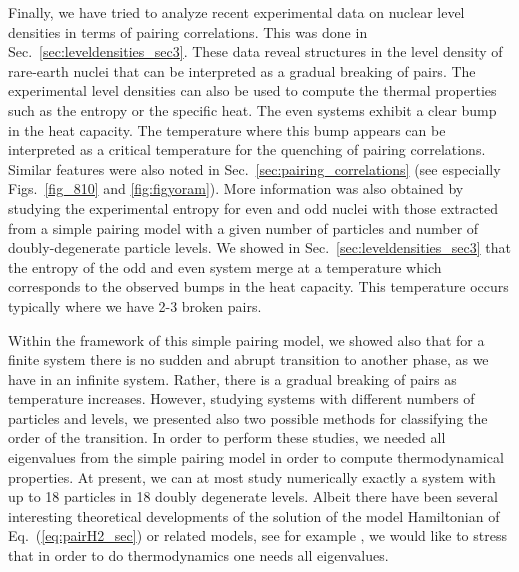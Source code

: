 \documentclass[preprint,rmp,aps,floatfix]{revtex4}
\begin{document}
Finally, we have tried to analyze recent experimental data on nuclear level
densities in terms of pairing correlations. This was done in 
Sec.~\ref{sec:leveldensities_sec3}. These data reveal structures in the level
density of rare-earth nuclei that can be interpreted as a gradual breaking
of pairs. The experimental level densities can also be used to compute the 
thermal properties such as the entropy or the specific heat.
The even systems exhibit a clear bump in the heat capacity. The temperature
where this bump appears can be interpreted as a critical temperature 
for the quenching of pairing correlations. Similar features were also noted in
Sec.~\ref{sec:pairing_correlations} (see especially Figs.~\ref{fig_810} and 
\ref{fig:figyoram}).
More information was also obtained by studying the 
experimental entropy for even and odd nuclei with those
extracted from a simple pairing model with a given number of particles 
and number of doubly-degenerate particle levels. We showed in 
Sec.~\ref{sec:leveldensities_sec3} that the entropy of the odd and even system
merge at a temperature which corresponds to the observed bumps in the 
heat capacity. This temperature occurs typically where we have 2-3 
broken pairs.

Within the framework of this simple pairing model, we 
showed also that for a finite system there is no sudden and abrupt transition
to another phase, as we have in an infinite system. Rather, there is a
gradual breaking of pairs as temperature increases. However, studying
systems with different numbers of particles and levels, we 
presented also two 
possible methods for classifying the order of the transition. 
In order to perform these studies, we needed all eigenvalues
from the simple pairing model in order to compute thermodynamical
properties. At present, we can at most study numerically exactly a system
with up to 18 particles in 18 doubly degenerate levels.
Albeit there have been several interesting theoretical developments
of the solution of the model Hamiltonian of Eq.~(\ref{eq:pairH2_sec})
or related models,
see for example 
\cite{richardson2002,dukelsky2002,volya_1,volya_3}, we would like to 
stress that in order to do thermodynamics one needs all eigenvalues. 
\end{document}
